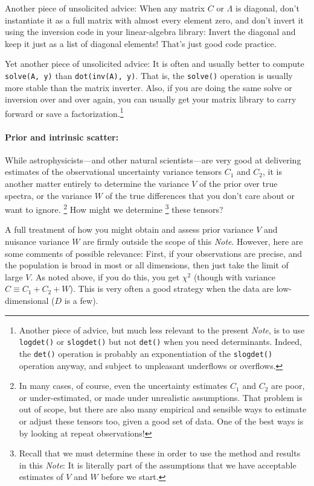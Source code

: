 \documentclass[12pt,letterpaper]{article}
\newcommand{\code}[1]{{\texttt{#1}}}
\newcommand{\documentname}{\textsl{Note}}
\begin{document}
Another piece of unsolicited advice: When any matrix $C$ or $\Lambda$
is diagonal, don't instantiate it as a full matrix with almost every
element zero, and don't invert it using the inversion code in your
linear-algebra library: Invert the diagonal and keep it just as a list
of diagonal elements! That's just good code practice.

Yet another piece of unsolicited advice: It is often and usually
better to compute \code{solve(A, y)} than \code{dot(inv(A), y)}. That
is, the \code{solve()} operation is usually more stable than the
matrix inverter.  Also, if you are doing the same solve or inversion
over and over again, you can usually get your matrix library to carry
forward or save a factorization.\footnote{Another piece of advice, but
  much less relevant to the present \documentname, is to use
  \code{logdet()} or \code{slogdet()} but not \code{det()} when you
  need determinants.  Indeed, the \code{det()} operation is probably
  an exponentiation of the \code{slogdet()} operation anyway, and
  subject to unpleasant underflows or overflows.}

\paragraph{Prior and intrinsic scatter:}
While astrophysicists---and other natural scientists---are
very good at delivering estimates
of the observational uncertainty variance tensors $C_1$ and $C_2$, it
is another matter entirely to determine the variance $V$ of the prior
over true spectra, or the variance $W$ of the true differences that
you don't care about or want to ignore.%
\footnote{In many cases, of course, even the uncertainty estimates
  $C_1$ and $C_2$ are poor, or under-estimated, or made under
  unrealistic assumptions. That problem is out of scope, but there are
  also many empirical and sensible ways to estimate or adjust these
  tensors too, given a good set of data. One of the best ways is by
  looking at repeat observations!}
How might we determine%
\footnote{Recall that we must determine these in order to use the
  method and results in this \documentname: It is literally part of
  the assumptions that we have acceptable estimates of $V$ and $W$
  before we start.} these tensors?

A full treatment of how you might obtain and assess prior variance $V$
and nuisance variance $W$ are firmly outside the scope of this
\documentname. However, here are some comments of possible relevance:
First, if your observations are precise, and the population is broad
in most or all dimensions, then just take the limit of large $V$. As
noted above, if you do this, you get $\chi^2$ (though with variance
$C\equiv C_1 + C_2 + W$). This is very often a good strategy when the
data are low-dimensional ($D$ is a few).
\end{document}
